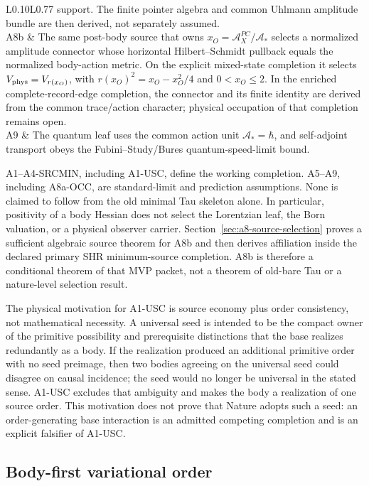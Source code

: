 \documentclass[11pt]{article}
\begin{document}
\begin{center}
\begin{tabular}{L{0.10\linewidth}L{0.77\linewidth}}
support.  The finite pointer algebra and common Uhlmann amplitude bundle are
then derived, not separately assumed.\\
A8b & The same post-body source that owns
\(x_O=\mathcal A_X^{PC}/\mathcal A_*\) selects a normalized amplitude
connector whose horizontal Hilbert--Schmidt pullback equals the normalized
body-action metric.  On the explicit mixed-state completion it selects
\(V_{\rm phys}=V_{r(x_O)}\), with
\(r(x_O)^2=x_O-x_O^2/4\) and \(0<x_O\leq2\).  In the enriched
complete-record-edge completion, the connector and its finite identity are
derived from the common trace/action character; physical occupation of that
completion remains open.\\
A9 & The quantum leaf uses the common action unit \(\mathcal A_*=\hbar\), and
self-adjoint transport obeys the Fubini--Study/Bures quantum-speed-limit
bound.\\
\bottomrule
\end{tabular}
\end{center}

A1--A4-SRCMIN, including A1-USC, define the working completion.  A5--A9, including A8a-OCC,
are standard-limit and
prediction assumptions.  None is claimed to follow from the old minimal Tau
skeleton alone.  In particular, positivity of a body Hessian does not select
the Lorentzian leaf, the Born valuation, or a physical observer carrier.
Section~\ref{sec:a8-source-selection} proves a sufficient algebraic source
theorem for A8b and then derives affiliation inside the declared primary SHR
minimum-source completion.  A8b is therefore a conditional theorem of that
MVP packet, not a theorem of old-bare Tau or a nature-level selection result.

The physical motivation for A1-USC is source economy plus order consistency,
not mathematical necessity.  A universal seed is intended to be the compact
owner of the primitive possibility and prerequisite distinctions that the
base realizes redundantly as a body.  If the realization produced an
additional primitive order with no seed preimage, then two bodies agreeing on
the universal seed could disagree on causal incidence; the seed would no
longer be universal in the stated sense.  A1-USC excludes that ambiguity and
makes the body a realization of one source order.  This motivation does not
prove that Nature adopts such a seed: an order-generating base interaction is
an admitted competing completion and is an explicit falsifier of A1-USC.

\subsection{Body-first variational order}
\end{document}
